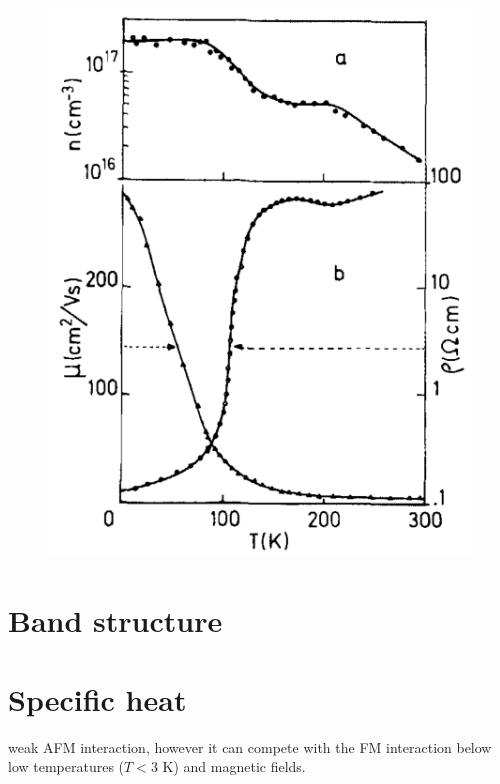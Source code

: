 \documentclass[preprint,pre,floats,aps,amsmath,amssymb]{revtex4}
\begin{document}
\begin{figure}[h]
\includegraphics[height=0.7\linewidth]{mobvstemp.png}
\centering{}
\end{figure}


\section{Band structure}


\section{Specific heat}

\cite{wang}  weak AFM interaction, however it can compete with the FM interaction below low temperatures ($T < 3$ K)
and magnetic fields.
\end{document}

